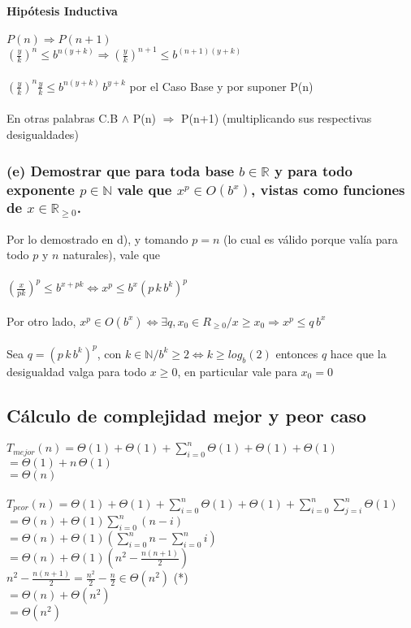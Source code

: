\documentclass[10pt, a4paper]{article}
\begin{document}
\paragraph*{Hipótesis Inductiva}
$P(n) \Rightarrow P(n+1)$ \\

$(\frac{y}{k})^n \le b^{n(y+k)} \Rightarrow (\frac{y}{k})^{n+1} \le b^{(n+1)(y+k)}$\\ \\
$(\frac{y}{k})^n \frac{y}{k} \le b^{n(y+k)} \, b^{y+k}$ por el Caso Base y por suponer P(n)\\ \\
En otras palabras C.B $\wedge$ P(n) $\Rightarrow$ P(n+1) (multiplicando sus respectivas desigualdades)
\newpage
\subsubsection*{(e) Demostrar que para toda base $b \in \mathbb{R}$ y para todo exponente $p \in \mathbb{N}$ vale que $x^p \in O(b^x)$, vistas como funciones de $x \in \mathbb R_{\ge 0}$.}

Por lo demostrado en d), y tomando $p=n$ (lo cual es válido porque valía para todo $p$ y $n$ naturales), vale que \\ \\
$(\frac{x}{pk})^p \le b^{x + pk} \Leftrightarrow \boxed{x^p \le b^x (p\,k\,b^k)^p}$\\ \\
Por otro lado, $x^p \in O(b^x) \Leftrightarrow \exists q, x_0 \in R_{\ge 0} / x\ge x_0 \Rightarrow x^p \le q \, b^x$\\ \\
Sea $q = (p\,k\,b^k)^p$, con $k \in \mathbb{N} / b^k \ge 2 \Leftrightarrow k \ge log_{b}(2)$ entonces $q$ hace que la desigualdad valga para todo $x \ge 0$, en particular vale para $x_0 = 0$

\subsection{Cálculo de complejidad mejor y peor caso}

$T_{mejor}(n) = \Theta (1) + \Theta (1) + \sum_{i=0}^{n} \Theta (1) +\Theta (1) + \Theta (1)$\\
 $= \Theta (1) + n \, \Theta (1)$\\
 $= \Theta (n)$\\ \\
$T_{peor}(n) = \Theta (1) + \Theta (1) + \sum_{i=0}^{n} \Theta (1) +\Theta (1) + \sum_{i=0}^{n} \sum_{j=i}^{n} \Theta (1)$\\
$= \Theta (n) +\Theta (1) \sum_{i=0}^{n}(n-i)$ \\
$= \Theta (n) +\Theta (1) (\sum_{i=0}^{n}n - \sum_{i=0}^{n}i)$\\
$= \Theta (n) +\Theta (1) (n^2 - \frac{n(n+1)}{2})$\\
$n^2 - \frac{n(n+1)}{2} = \frac{n^2}{2} - \frac{n}{2} \in \Theta (n^2)$ (*)\\
$= \Theta (n) +\Theta (n^2)$\\
$=\Theta (n^2)$\\ \\
\end{document}
